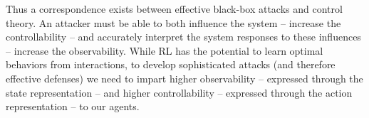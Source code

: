 Thus a correspondence exists between effective black-box attacks and control theory.
An attacker must be able to both influence the system -- increase the controllability -- and accurately interpret the system responses to these influences -- increase the observability.
While \gls{RL} has the potential to learn optimal behaviors from interactions, to develop sophisticated attacks (and therefore effective defenses) we need to impart higher observability -- expressed through the state representation -- and higher controllability -- expressed through the action representation -- to our agents.

